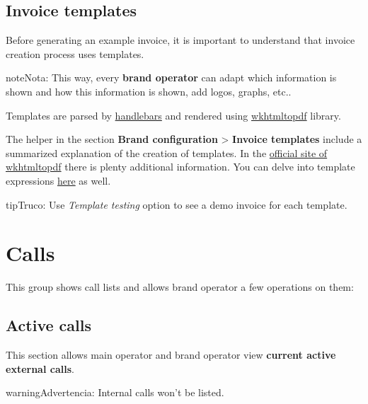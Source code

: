 \documentclass[letterpaper,10pt,spanish]{sphinxmanual}
\begin{document}
\subsection{Invoice templates}
\label{administration_portal/brand/invoicing/invoice_templates::doc}\label{administration_portal/brand/invoicing/invoice_templates:invoice-templates}
Before generating an example invoice, it is important to understand that invoice
creation process uses templates.

\begin{notice}{note}{Nota:}
This way, every \textbf{brand operator} can adapt which information
is shown and how this information is shown, add logos, graphs, etc..
\end{notice}

Templates are parsed by \href{https://github.com/XaminProject/handlebars.php}{handlebars} and rendered
using \href{https://wkhtmltopdf.org/}{wkhtmltopdf} library.

The helper in the section \textbf{Brand configuration} \textgreater{} \textbf{Invoice templates} include
a summarized explanation of the creation of templates. In the \href{https://wkhtmltopdf.org/usage/wkhtmltopdf.txt}{official site of wkhtmltopdf} there is plenty additional information.
You can delve into template expressions \href{http://handlebarsjs.com/expressions.html}{here} as well.

\begin{notice}{tip}{Truco:}
Use \emph{Template testing} option to see a demo invoice for each template.
\end{notice}


\section{Calls}
\label{administration_portal/brand/calls/index::doc}\label{administration_portal/brand/calls/index:calls}
This group shows call lists and allows brand operator a few operations on them:


\subsection{Active calls}
\label{administration_portal/brand/calls/active_calls::doc}\label{administration_portal/brand/calls/active_calls:active-calls}
This section allows main operator and brand operator view \textbf{current active external calls}.

\begin{notice}{warning}{Advertencia:}
Internal calls won't be listed.
\end{notice}
\end{document}
